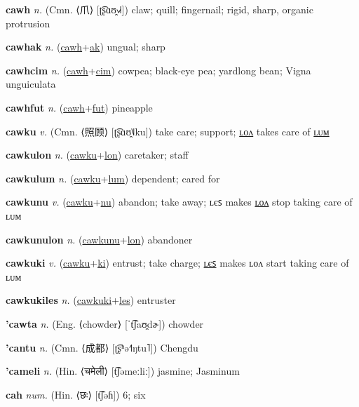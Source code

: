 \textbf{\hypertarget{cawh}{cawh}} \textit{n.} (Cmn. ⟨{\chinese{}爪}⟩ [ʈ͡ʂɑʊ̯˧˩˧])
claw; quill; fingernail; rigid, sharp, organic protrusion

\textbf{\hypertarget{cawhak}{cawhak}} \textit{n.} (\hyperlink{cawh}{cawh}+\allowbreak \hyperlink{ak}{ak})
ungual; sharp

\textbf{\hypertarget{cawhcim}{cawhcim}} \textit{n.} (\hyperlink{cawh}{cawh}+\allowbreak \hyperlink{cim}{cim})
cowpea; black-eye pea; yardlong bean; Vigna unguiculata

\textbf{\hypertarget{cawhfut}{cawhfut}} \textit{n.} (\hyperlink{cawh}{cawh}+\allowbreak \hyperlink{fut}{fut})
pineapple

\textbf{\hypertarget{cawku}{cawku}} \textit{v.} (Cmn. ⟨{\chinese{}照顾}⟩ [ʈ͡ʂɑʊ̯˥˩ku])
take care; support; \hyperlink{cawkulon}{ʟᴏᴧ} takes care of \hyperlink{cawkulum}{ʟᴜᴍ}

\textbf{\hypertarget{cawkulon}{cawkulon}} \textit{n.} (\hyperlink{cawku}{cawku}+\allowbreak \hyperlink{lon}{lon})
caretaker; staff

\textbf{\hypertarget{cawkulum}{cawkulum}} \textit{n.} (\hyperlink{cawku}{cawku}+\allowbreak \hyperlink{lum}{lum})
dependent; cared for

\textbf{\hypertarget{cawkunu}{cawkunu}} \textit{v.} (\hyperlink{cawku}{cawku}+\allowbreak \hyperlink{nu}{nu})
abandon; take away; ʟєꜱ makes \hyperlink{cawkunulon}{ʟᴏᴧ} stop taking care of ʟᴜᴍ

\textbf{\hypertarget{cawkunulon}{cawkunulon}} \textit{n.} (\hyperlink{cawkunu}{cawkunu}+\allowbreak \hyperlink{lon}{lon})
abandoner

\textbf{\hypertarget{cawkuki}{cawkuki}} \textit{v.} (\hyperlink{cawku}{cawku}+\allowbreak \hyperlink{ki}{ki})
entrust; take charge; \hyperlink{cawkukiles}{ʟєꜱ} makes ʟᴏᴧ start taking care of ʟᴜᴍ

\textbf{\hypertarget{cawkukiles}{cawkukiles}} \textit{n.} (\hyperlink{cawkuki}{cawkuki}+\allowbreak \hyperlink{les}{les})
entruster

\textbf{\hypertarget{'cawta}{'cawta}} \textit{n.} (Eng. ⟨chowder⟩ [ˈt͡ʃaʊ̯dɚ])
chowder

\textbf{\hypertarget{'cantu}{'cantu}} \textit{n.} (Cmn. ⟨{\chinese{}成都}⟩ [ʈ͡ʂʰə˧˥ŋtu˥])
Chengdu

\textbf{\hypertarget{'cameli}{'cameli}} \textit{n.} (Hin. ⟨{\devanagari{}चमेली}⟩ [t͡ʃəmeːliː])
jasmine; Jasminum

\textbf{\hypertarget{cah}{cah}} \textit{num.} (Hin. ⟨{\devanagari{}छः}⟩ [t͡ʃəɦ])
6; six

